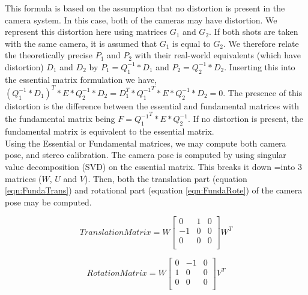 This formula is based on the assumption that no distortion is present in the camera system. In this case, both of the cameras may have distortion. We represent this distortion here using matrices $G_1$ and $G_2$. If both shots are taken with the same camera, it is assumed that $G_1$ is equal to $G_2$. We therefore relate the theoretically precise $P_1$ and $P_2$ with their real-world equivalents (which have distortion) $D_1$ and $D_2$ by $P_1 = Q_1^{-1} * D_1$ and $P_2 = Q_2^{-1} * D_2$. Inserting this into the essential matrix formulation we have, $(Q_1^{-1} * D_1)^T * E * Q_2^{-1} * D_2 = D_{1}^{T} * {Q_1^{-1}}^{T} * E * Q_2^{-1} * D_2 = 0$. The presence of this distortion is the difference between the essential and fundamental matrices with the fundamental matrix being $F = {Q_1^{-1}}^{T} * E * Q_2^{-1}$. If no distortion is present, the fundamental matrix is equivalent to the essential matrix. \\

Using the Essential or Fundamental matrices, we may compute both camera pose, and stereo calibration. The camera pose is computed by using singular value decomposition (SVD) on the essential matrix. This breaks it down =into 3 matrices ($W$, $U$ and $V$). Then, both the translation part (equation \ref{eqn:FundaTrans}) and rotational part (equation \ref{eqn:FundaRote}) of the camera pose may be computed.


\begin{equation} \label{eqn:FundaTrans}
Translation Matrix = W\left[
\begin{array}{ccc}
0 & 1 & 0 \\
-1 & 0 & 0 \\
0 & 0 & 0 \\
\end{array}
\right]W^{T}
\end{equation}

\begin{equation} \label{eqn:FundaRote}
Rotation Matrix = W\left[
\begin{array}{ccc}
0 & -1 & 0 \\
1 & 0 & 0 \\
0 & 0 & 0 \\
\end{array}
\right]V^{T}
\end{equation}


